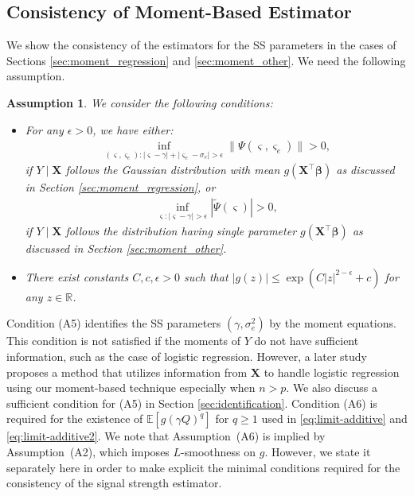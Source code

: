 \documentclass[12pt,reqno]{amsart}
\newtheorem{assumption}{Assumption}
\newcommand{\R}{\mathbb{R}}
\newcommand{\E}{\mathbb{E}}
\newcommand{\rc}{\color{black}}
\newcommand{\cc}{\color{black}}
\def\bX{\bm{X}}
\def\bbeta{\bm{\beta}}
\begin{document}
\subsection{Consistency of Moment-Based Estimator}

We show the consistency of the estimators for the SS parameters in the cases of Sections \ref{sec:moment_regression} and \ref{sec:moment_other}.
We need the following assumption.
\begin{assumption} \label{asmp:g_estimation}
    We consider the following conditions:
\setlength{\leftmargini}{27pt} 
    \begin{itemize}
      \setlength{\parskip}{0cm}
  \setlength{\itemsep}{0cm}
        \item [(A5)] For any $\epsilon>0$, we have either: 
        \begin{align}
            \inf_{(\varsigma,\varsigma_e):|\varsigma-\gamma|+|\varsigma_e-\sigma_e|>\epsilon}\|\Psi(\varsigma,\varsigma_e)\|>0,
        \end{align}
        {\cc if $Y\mid\bX$ follows the Gaussian distribution with mean $g(\bX^\top\bbeta)$ as discussed in Section \ref{sec:moment_regression}}, or 
        \begin{align}
            \inf_{\varsigma:|\varsigma-\gamma|>\epsilon}|\tilde\Psi(\varsigma)|>0,
        \end{align}
        {\cc if $Y\mid\bX$ follows the distribution having single parameter $g(\bX^\top\bbeta)$ as discussed in Section \ref{sec:moment_other}}. 
        \item [(A6)] There exist constants $C,c,\epsilon>0$ such that {\cc$|g(z)|\le\exp(C|z|^{2-\epsilon}+c)$} for any $z \in \R$. 
    \end{itemize}
\end{assumption}
Condition (A5) identifies the SS parameters $(\gamma,\sigma_e^2)$ by the moment equations. This condition is not satisfied if the moments of $Y$ do not have sufficient information, such as the case of logistic regression. 
{\rc
However, a later study \cite{chen2024method} proposes a method that utilizes information from $\bX$ to handle logistic regression using our moment-based technique especially when $n>p$. }
We also discuss a sufficient condition for (A5) in Section \ref{sec:identification}.
Condition (A6) is required for the existence of $\E[g(\gamma Q)^q]$ for $q \geq 1$ used in \eqref{eq:limit-additive} and \eqref{eq:limit-additive2}.
{\cc We note that Assumption~(A6) is implied by Assumption~(A2), which imposes $L$-smoothness on $g$. However, we state it separately here in order to make explicit the minimal conditions required for the consistency of the signal strength estimator.}
\end{document}
